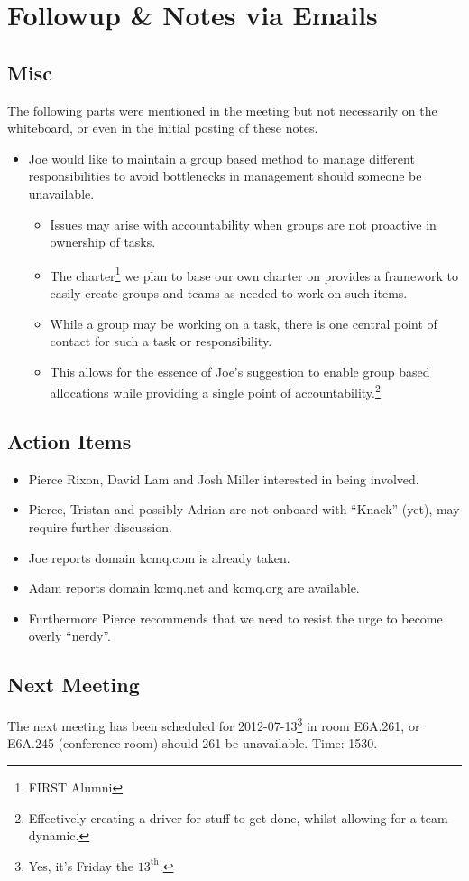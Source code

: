 \section{Followup \& Notes via Emails}

\subsection{Misc}
\label{sec:Misc}
The following parts were mentioned in the meeting but not necessarily on the whiteboard, or even in the initial posting of these notes.
\begin{itemize}
  \item Joe would like to maintain a group based method to manage different responsibilities to avoid
        bottlenecks in management should someone be unavailable.
  \begin{itemize}
    \item Issues may arise with accountability when groups are not proactive in ownership of tasks.
    \item The charter\footnote{FIRST Alumni} we plan to base our own charter on provides a framework to
          easily create groups and teams as needed to work on such items.
    \item While a group may be working on a task, there is one central point of contact for such a task
          or responsibility.
    \item This allows for the essence of Joe's suggestion to enable group based allocations while
          providing a single point of accountability.\footnote{Effectively creating a driver for stuff to
          get done, whilst allowing for a team dynamic.}
  \end{itemize}
\end{itemize}

\label{sec:Followup}
\subsection{Action Items}
\begin{itemize}
  \item Pierce Rixon, David Lam and Josh Miller interested in being involved.
  \item Pierce, Tristan and possibly Adrian are not onboard with ``Knack''
  (yet), may require further discussion.
  \item Joe reports domain kcmq.com is already taken.
  \item Adam reports domain kcmq.net and kcmq.org are available.
  \item Furthermore Pierce recommends that we need to resist the urge to become
  overly ``nerdy''.
\end{itemize}

\subsection{Next Meeting}
The next meeting has been scheduled for 2012-07-13\footnote{Yes, it's Friday the
$13^\text{th}$.} in room E6A.261, or E6A.245 (conference room) should 261 be
unavailable. Time: 1530.
